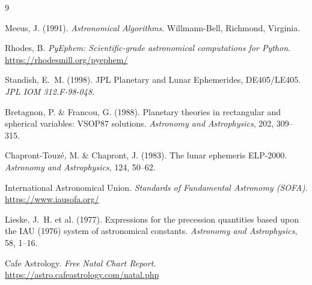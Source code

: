 \documentclass[11pt,letterpaper,twocolumn]{article}
\begin{document}
\begin{thebibliography}{9}

Meeus, J. (1991).
\textit{Astronomical Algorithms}.
Willmann-Bell, Richmond, Virginia.

Rhodes, B.
\textit{PyEphem: Scientific-grade astronomical computations for Python}.
\url{https://rhodesmill.org/pyephem/}

Standish, E.~M. (1998).
JPL Planetary and Lunar Ephemerides, DE405/LE405.
\textit{JPL IOM 312.F-98-048}.

Bretagnon, P. \& Francou, G. (1988).
Planetary theories in rectangular and spherical variables: VSOP87 solutions.
\textit{Astronomy and Astrophysics}, 202, 309--315.

Chapront-Touz\'{e}, M. \& Chapront, J. (1983).
The lunar ephemeris ELP-2000.
\textit{Astronomy and Astrophysics}, 124, 50--62.

International Astronomical Union.
\textit{Standards of Fundamental Astronomy (SOFA)}.
\url{https://www.iausofa.org/}

Lieske, J.~H. et al. (1977).
Expressions for the precession quantities based upon the IAU (1976) system of astronomical constants.
\textit{Astronomy and Astrophysics}, 58, 1--16.

Cafe Astrology.
\textit{Free Natal Chart Report}.
\url{https://astro.cafeastrology.com/natal.php}

\end{thebibliography}
\end{document}
